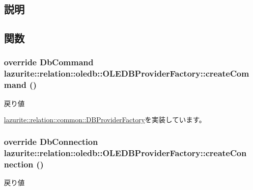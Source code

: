 \subsection{説明}


\subsection{関数}
\hypertarget{classlazurite_1_1relation_1_1oledb_1_1_o_l_e_d_b_provider_factory_a9cf2e12a8efe659885fd1e5fa014243f}{
\subsubsection[{createCommand}]{\setlength{\rightskip}{0pt plus 5cm}override DbCommand lazurite::relation::oledb::OLEDBProviderFactory::createCommand ()}}
\label{classlazurite_1_1relation_1_1oledb_1_1_o_l_e_d_b_provider_factory_a9cf2e12a8efe659885fd1e5fa014243f}
\begin{DoxyReturn}{戻り値}

\end{DoxyReturn}


\hyperlink{classlazurite_1_1relation_1_1common_1_1_d_b_provider_factory_a80d5a53dcf06278b37133c7013f02f71}{lazurite::relation::common::DBProviderFactory}を実装しています。\hypertarget{classlazurite_1_1relation_1_1oledb_1_1_o_l_e_d_b_provider_factory_a3f9cfbeba5e17982171b58079d9f4067}{
\subsubsection[{createConnection}]{\setlength{\rightskip}{0pt plus 5cm}override DbConnection lazurite::relation::oledb::OLEDBProviderFactory::createConnection ()}}
\label{classlazurite_1_1relation_1_1oledb_1_1_o_l_e_d_b_provider_factory_a3f9cfbeba5e17982171b58079d9f4067}
\begin{DoxyReturn}{戻り値}

\end{DoxyReturn}


